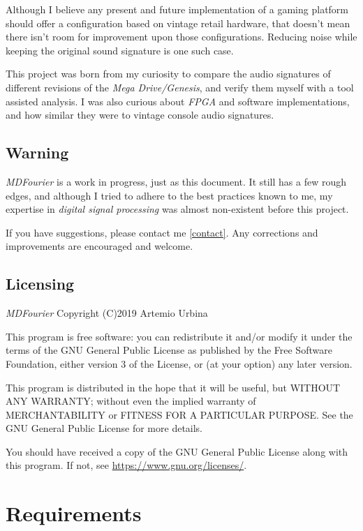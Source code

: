 \documentclass[10pt,a4paper]{report}
\begin{document}
Although I believe any present and future implementation of a gaming platform should offer a configuration based on vintage retail hardware, that doesn't mean there isn't room for improvement upon those configurations. Reducing noise while keeping the original sound signature is one such case.

This project was born from my curiosity to compare the audio signatures of different revisions of the  \textit{Mega Drive/Genesis}, and verify them myself with a tool assisted analysis. I was also curious about \textit{FPGA} and software implementations, and how similar they were to vintage console audio signatures.

\section{Warning}

\textit{MDFourier} is a work in progress, just as this document. It still has a few rough edges, and although I tried to adhere to the best practices known to me, my expertise in \textit{digital signal processing} was almost non-existent before this project. 

If you have suggestions, please contact me \ref{contact}. Any corrections and improvements are encouraged and welcome.

\section{Licensing}

\textit{MDFourier} Copyright (C)2019 Artemio Urbina

This program is free software: you can redistribute it and/or modify
it under the terms of the GNU General Public License as published by
the Free Software Foundation, either version 3 of the License, or
(at your option) any later version.

This program is distributed in the hope that it will be useful,
but WITHOUT ANY WARRANTY; without even the implied warranty of
MERCHANTABILITY or FITNESS FOR A PARTICULAR PURPOSE.  See the
GNU General Public License for more details.

You should have received a copy of the GNU General Public License
along with this program.  If not, see \url{https://www.gnu.org/licenses/}.

\chapter{Requirements}
\end{document}
